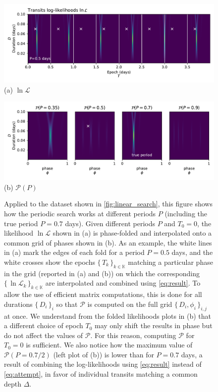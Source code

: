 \documentclass[modern]{aastex631}
\newcommand{\set}[1]{\{\,#1\,\}}
\begin{document}
\begin{figure}[H]
    \centering
    \includegraphics[width=\linewidth]{../workflows/principle/figures/principle_periodic_0.pdf}\\
    {(a) $\ln \mathcal{L}$}
\end{figure}

\begin{figure}[H]
    \centering
    \includegraphics[width=\linewidth]{../workflows/principle/figures/principle_periodic_1.pdf}\\
    {(b) $\mathcal{P}(P)$}

    \caption{Applied to the dataset shown in \autoref{fig:linear_search}, this figure shows how the periodic search works at different periods $P$ (including the true period $P = 0.7$ days). Given different periods $P$ and $T_0=0$, the likelihood $\ln\mathcal{L}$ shown in (a) is phase-folded and interpolated onto a common grid of phases shown in (b). As an example, the white lines in (a) mark the edges of each fold for a period $P=0.5$ days, and the white crosses show the epochs $\set{T_k}_{k\in\mathbb{K}}$ matching a particular phase in the grid (reported in (a) and (b)) on which the corresponding $\set{\ln \mathcal{L}_k}_{k\in\mathbb{K}}$ are interpolated and combined using \autoref{eq:result}. To allow the use of efficient matrix computations, this is done for all durations $\set{D_i}_i$ so that $\mathcal{P}$ is computed on the full grid $\set{D_i, \phi_i}_{i, j}$ at once. We understand from the folded likelihoods plots in (b) that a different choice of epoch $T_0$ may only shift the results in phase but do not affect the values of $\mathcal{P}$. For this reason, computing $\mathcal{P}$ for $T_0=0$ is sufficient. We also notice how the maximum value of $\mathcal{P}(P=0.7/2)$ (left plot of (b)) is lower than for $P=0.7$ days, a result of combining the log-likelihoods using \autoref{eq:result} instead of \autoref{eq:attempt}, in favor of individual transits matching a common depth $\Delta$.}
    \label{fig:periodic_search}
\end{figure}
\end{document}
